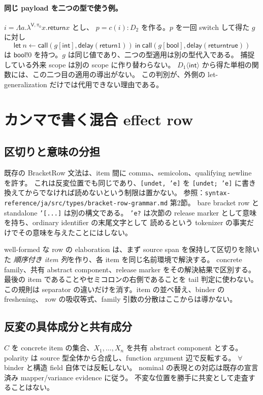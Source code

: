 \documentclass[11pt,a4paper]{article}
\newcommand{\Ret}{\mathsf{return}}
\newcommand{\Call}{\mathsf{call}}
\newcommand{\Delay}{\mathsf{delay}}
\begin{document}
\paragraph{同じ payload を二つの型で使う例。}
\(i=\Lambda a.\lambda^{\mathsf V,\pi_0}x.\Ret x\) とし、
\(p=c(i):D_2\) を作る。\(p\) を一回 switch して得た \(g\) に対し
\[
 \mathsf{let}\ n\leftarrow\Call(g[\mathsf{int}],\Delay(\Ret 1))\ \mathsf{in}\
 \Call(g[\mathsf{bool}],\Delay(\Ret\mathsf{true}))
\]
は \(\mathsf{bool}!0\) を持つ。\(g\) は同じ値であり、二つの型適用は別の型代入である。
捕捉している外来 scope は別の scope に作り替わらない。
\(D_1\langle\mathsf{int}\rangle\) から得た単相の関数には、この二つ目の適用の導出がない。
この判別が、外側の let-generalization だけでは代用できない理由である。

\section{カンマで書く混合 effect row}
\label{sec:mixed-row}

\subsection{区切りと意味の分担}

既存の BracketRow 文法は、item 間に comma、semicolon、qualifying newline を許す。
これは反変位置でも同じであり、\texttt{[undet, 'e]} を
\texttt{[undet; 'e]} に書き換えてからでなければ読めないという制限は置かない。
参照：\nolinkurl{syntax-reference/ja/src/types/bracket-row-grammar.md} 第2節。
bare bracket row と standalone \texttt{'[...]} は別の構文である。
\texttt{'e?} は次節の release marker として意味を持ち、ordinary identifier の末尾文字として
読めるという tokenizer の事実だけでその意味を与えたことにはしない。

well-formed な row の elaboration は、まず source span を保持して区切りを除いた
\emph{順序付き item 列}を作り、各 item を同じ名前環境で解決する。
concrete family、共有 abstract component、release marker をその解決結果で区別する。
最後の item であることやセミコロンの右側であることを tail 判定に使わない。
この規則は separator の違いだけを消す。item の並べ替え、binder の freshening、
row の吸収等式、family 引数の分散はここからは導かない。

\subsection{反変の具体成分と共有成分}

\(C\) を concrete item の集合、\(X_1,\ldots,X_n\) を共有 abstract component とする。
polarity は source 型全体から合成し、function argument 辺で反転する。
\(\forall\) binder と構造 field 自体では反転しない。
nominal の表現との対応は既存の宣言済み mapper/variance evidence に従う。
不変な位置を勝手に共変として走査することはない。
\end{document}
